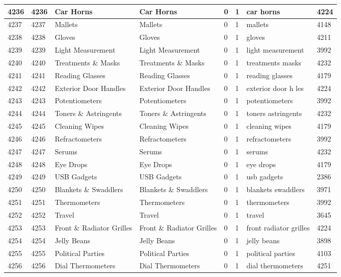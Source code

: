 \begin{longtable}{|l|l|l|l|l|l|l|l|}
4236 & 4236 & Car Horns & Car Horns & 0 & 1 & car horns & 4224 \\ \hline 
4237 & 4237 & Mallets & Mallets & 0 & 1 & mallets & 4148 \\ \hline 
4238 & 4238 & Gloves & Gloves & 0 & 1 & gloves & 4211 \\ \hline 
4239 & 4239 & Light Measurement & Light Measurement & 0 & 1 & light measurement & 3992 \\ \hline 
4240 & 4240 & Treatments \& Masks & Treatments \& Masks & 0 & 1 & treatments masks & 4232 \\ \hline 
4241 & 4241 & Reading Glasses & Reading Glasses & 0 & 1 & reading glasses & 4179 \\ \hline 
4242 & 4242 & Exterior Door Handles & Exterior Door Handles & 0 & 1 & exterior door h les & 4224 \\ \hline 
4243 & 4243 & Potentiometers & Potentiometers & 0 & 1 & potentiometers & 3992 \\ \hline 
4244 & 4244 & Toners \& Astringents & Toners \& Astringents & 0 & 1 & toners astringents & 4232 \\ \hline 
4245 & 4245 & Cleaning Wipes & Cleaning Wipes & 0 & 1 & cleaning wipes & 4179 \\ \hline 
4246 & 4246 & Refractometers & Refractometers & 0 & 1 & refractometers & 3992 \\ \hline 
4247 & 4247 & Serums & Serums & 0 & 1 & serums & 4232 \\ \hline 
4248 & 4248 & Eye Drops & Eye Drops & 0 & 1 & eye drops & 4179 \\ \hline 
4249 & 4249 & USB Gadgets & USB Gadgets & 0 & 1 & usb gadgets & 2386 \\ \hline 
4250 & 4250 & Blankets \& Swaddlers & Blankets \& Swaddlers & 0 & 1 & blankets swaddlers & 3971 \\ \hline 
4251 & 4251 & Thermometers & Thermometers & 0 & 1 & thermometers & 3992 \\ \hline 
4252 & 4252 & Travel & Travel & 0 & 1 & travel & 3645 \\ \hline 
4253 & 4253 & Front \& Radiator Grilles & Front \& Radiator Grilles & 0 & 1 & front radiator grilles & 4224 \\ \hline 
4254 & 4254 & Jelly Beans & Jelly Beans & 0 & 1 & jelly beans & 3898 \\ \hline 
4255 & 4255 & Political Parties & Political Parties & 0 & 1 & political parties & 4103 \\ \hline 
4256 & 4256 & Dial Thermometers & Dial Thermometers & 0 & 1 & dial thermometers & 4251 \\ \hline 

\end{longtable}
